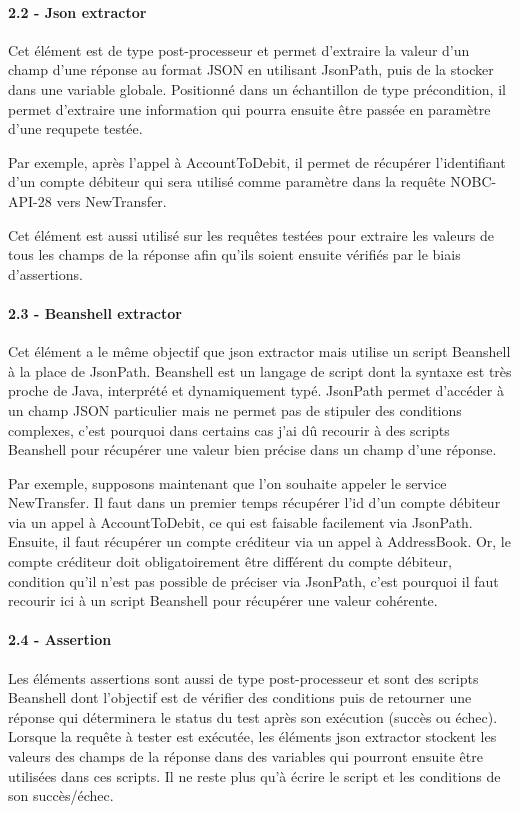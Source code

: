 	\paragraph{2.2 - Json extractor}
	Cet élément est de type post-processeur et permet d'extraire la valeur d'un champ d'une réponse au format JSON en utilisant JsonPath, puis de la stocker dans une variable globale. Positionné dans un échantillon de type précondition, il permet d'extraire une information qui pourra ensuite être passée en paramètre d'une requpete testée.
	
	Par exemple, après l'appel à AccountToDebit, il permet de récupérer l'identifiant d'un compte débiteur qui sera utilisé comme paramètre dans la requête NOBC-API-28 vers NewTransfer.
	
	Cet élément est aussi utilisé sur les requêtes testées pour extraire les valeurs de tous les champs de la réponse afin qu'ils soient ensuite vérifiés par le biais d'assertions.
	
	\paragraph{2.3 - Beanshell extractor}
	Cet élément a le même objectif que json extractor mais utilise un script Beanshell à la place de JsonPath. Beanshell est un langage de script dont la syntaxe est très proche de Java, interprété et dynamiquement typé. JsonPath permet d'accéder à un champ JSON particulier mais ne permet pas de stipuler des conditions complexes, c'est pourquoi dans certains cas j'ai dû recourir à des scripts Beanshell pour récupérer une valeur bien précise dans un champ d'une réponse.
	
	Par exemple, supposons maintenant que l'on souhaite appeler le service NewTransfer. Il faut dans un premier temps récupérer l'id d'un compte débiteur via un appel à AccountToDebit, ce qui est faisable facilement via JsonPath. Ensuite, il faut récupérer un compte créditeur via un appel à AddressBook. Or, le compte créditeur doit obligatoirement être différent du compte débiteur, condition qu'il n'est pas possible de préciser via JsonPath, c'est pourquoi il faut recourir ici à un script Beanshell pour récupérer une valeur cohérente.
	
	\paragraph{2.4 - Assertion}
	Les éléments assertions sont aussi de type post-processeur et sont des scripts Beanshell dont l'objectif est de vérifier des conditions puis de retourner une réponse qui déterminera le status du test après son exécution (succès ou échec). Lorsque la requête à tester est exécutée, les éléments json extractor stockent les valeurs des champs de la réponse dans des variables qui pourront ensuite être utilisées dans ces scripts. Il ne reste plus qu'à écrire le script et les conditions de son succès/échec.
	
